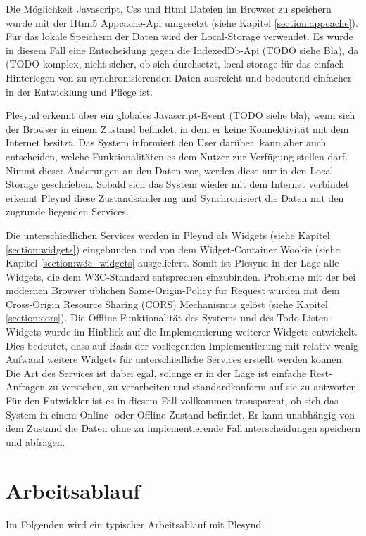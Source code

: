 Die Möglichkeit Javascript, Css und Html Dateien im Browser zu speichern wurde mit der Html5 Appcache-Api umgesetzt (siehe Kapitel \ref{section:appcache}). Für das lokale Speichern der Daten wird der Local-Storage verwendet. Es wurde in diesem Fall eine Entscheidung gegen die IndexedDb-Api (TODO siehe Bla), da (TODO komplex, nicht sicher, ob sich durchsetzt, local-storage für das einfach Hinterlegen von zu synchronisierenden Daten ausreicht und bedeutend einfacher in der Entwicklung und Pflege ist.

Plesynd erkennt über ein globales Javascript-Event (TODO siehe bla), wenn sich der Browser in einem Zustand befindet, in dem er keine Konnektivität mit dem Internet besitzt. Das System informiert den User darüber, kann aber auch entscheiden, welche Funktionalitäten es dem Nutzer zur Verfügung stellen darf. Nimmt dieser Änderungen an den Daten vor, werden diese nur in den Local-Storage geschrieben. Sobald sich das System wieder mit dem Internet verbindet erkennt Pleynd diese Zustandsänderung und Synchronisiert die Daten mit den zugrunde liegenden Services. 

Die unterschiedlichen Services werden in Pleynd als Widgets (siehe Kapitel \ref{section:widgets}) eingebunden und von dem Widget-Container Wookie (siehe Kapitel \ref{section:w3c_widgets} ausgeliefert. Somit ist Plesynd in der Lage alle Widgets, die dem W3C-Standard entsprechen einzubinden. Probleme mit der bei modernen Browser üblichen Same-Origin-Policy für Request wurden mit dem Cross-Origin Resource Sharing (CORS) Mechanismus gelöst (siehe Kapitel \ref{section:cors}). Die Offline-Funktionalität des Systems und des Todo-Listen-Widgets wurde im Hinblick auf die Implementierung weiterer Widgets entwickelt. Dies bedeutet, dass auf Basis der vorliegenden Implementierung mit relativ wenig Aufwand weitere Widgets für unterschiedliche Services erstellt werden können. Die Art des Services ist dabei egal, solange er in der Lage ist einfache Rest-Anfragen zu verstehen, zu verarbeiten und standardkonform auf sie zu antworten. Für den Entwickler ist es in diesem Fall vollkommen transparent, ob sich das System in einem Online- oder Offline-Zustand befindet. Er kann unabhängig von dem Zustand die Daten ohne zu implementierende Fallunterscheidungen speichern und abfragen.

\section{Arbeitsablauf}
Im Folgenden wird ein typischer Arbeitsablauf mit Plesynd





